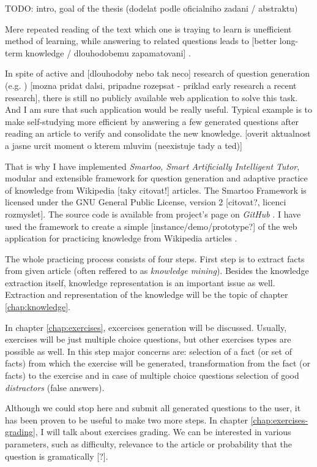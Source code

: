 \documentclass[a4paper, 12pt, twoside]{fithesis2}		%
\renewcommand{\_}{\leavevmode \kern0.0em\vbox{\hrule width0.4em}}
\begin{document}
TODO: intro, goal of the thesis (dodelat podle oficialniho zadani / abstraktu)

Mere repeated reading of the text which one is traying to learn is unefficient method of learning, while answering to related questions leads to [better long-term knowledge / dlouhodobemu zapamatovani] \parencite{edu-improve}.

In spite of active and [dlouhodoby nebo tak neco] research of question generation (e.g. \parencite{questions-wolfe, questions-eval}) [mozna pridat dalsi, pripadne rozepsat - priklad early research a recent research],
there is still no publicly available web application to solve this task.
And I am sure that such application would be really useful. Typical example is to make self-studying more efficient by answering a few generated questions after reading an article to verify and consolidate the new knowledge.
[overit aktualnost a jasne urcit moment o kterem mluvim (neexistuje tady a ted)]

That is why I have implemented \textit{Smartoo, Smart Artificially Intelligent Tutor}, modular and extensible framework for question generation and adaptive practice
of knowledge from Wikipedia [taky citovat!] articles.
The Smartoo Framework is licensed under the GNU General Public License, version 2 [citovat?, licenci rozmyslet].
The source code is available from project's page on \textit{GitHub} \parencite{smartoo-github}.
I have used the framework to create a simple [instance/demo/prototype?] of the web application for practicing knowledge from Wikipedia articles \parencite{smartoo-web}.

The whole practicing process consists of four steps.
First step is to extract facts from given article (often reffered to as \textit{knowledge mining}).
Besides the knowledge extraction itself, knowledge representation is an important issue as well.
Extraction and representation of the knowledge will be the topic of chapter \ref{chap:knowledge}.

In chapter \ref{chap:exercises}, excercises generation will be discussed.
Usually, exercises will be just multiple choice questions, but other exercises types are possible as well.
In this step major concerns are: selection of a fact (or set of facts) from which the exercise will be generated, transformation from the fact (or facts) to the exercise and in case of multiple choice questions selection of good \textit{distractors} (false answers).

Although we could stop here and submit all generated questions to the user, it has been proven to be useful to make two more steps.
In chapter \ref{chap:exercises-grading}, I will talk about exercises grading.
We can be interested in various parameters, such as difficulty, relevance to the article or probability that the question is gramatically [?].
\end{document}
